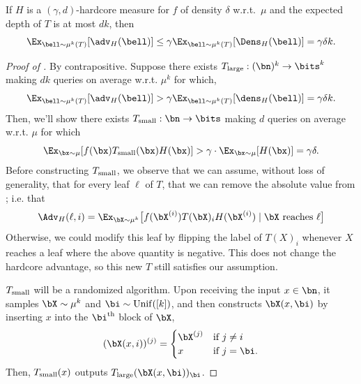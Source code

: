 \begin{lemma}
\label{lem:expected total hardcore advantage body}
    If $H$ is a $(\gamma, d)$-hardcore measure for $f$ of density $\delta$ w.r.t.~$\mu$ and the expected depth of $T$ is at most $dk$, then 
    \begin{equation*}
        \Ex_{\bell \sim \mu^k(T)}[\adv_H(\bell)] \leq \gamma \Ex_{\bell\sim\mu^k(T)}[\Dens_H(\bell)] = \gamma \delta k. 
    \end{equation*}
\end{lemma}
\begin{proof}[Proof of ]
    By contrapositive. Suppose there exists $T_{\textnormal{large}}:(\bn)^k \to \bits^k$ making $dk$ queries on average w.r.t. $\mu^k$ for which,
    \begin{equation*}
        \Ex_{\bell \sim \mu^k(T)}[\adv_H(\bell)] > \gamma \Ex_{\bell\sim \mu^k(T)}[\dens_H(\bell)] = \gamma\delta k.
    \end{equation*}
    Then, we'll show there exists $T_{\textnormal{small}}:\bn \to \bits$ making $d$ queries on average w.r.t. $\mu$ for which
    \begin{equation*}
        \Ex_{\bx \sim \mu}[ f(\bx) T_{\textnormal{small}}(\bx) H(\bx)] > \gamma \cdot \Ex_{\bx \sim \mu}[H(\bx)] = \gamma \delta.
    \end{equation*}
    Before constructing $T_{\textnormal{small}}$, we observe that we can assume, without loss of generality, that for every leaf $\ell$ of $T$, that we can remove the absolute value from ; i.e. that
    \begin{equation*}
        \Adv_H(\ell,i) = \Ex_{\bX\sim \mu^k}\big[ f(\bX^{(i)})T(\bX)_i H(\bX^{(i)})\mid \text{$\bX$ reaches $\ell$}\big]
    \end{equation*}
    Otherwise, we could modify this leaf by flipping the label of $T(X)_i$ whenever $X$ reaches a leaf where the above quantity is negative. This does not change the hardcore advantage, so this new $T$ still satisfies our assumption.
    
    $T_{\textnormal{small}}$ will be a randomized algorithm. Upon receiving the input $x \in \bn$, it samples $\bX \sim \mu^k$ and $\bi \sim \mathrm{Unif}([k])$, and then constructs $\bX(x, \bi)$ by inserting $x$ into the $\bi^{\text{th}}$ block of $\bX$,
    \begin{equation*}
        (\bX(x, i))^{(j)} = \begin{cases}
            \bX^{(j)} &\text{if }j \neq i\\
            x&\text{if }j = \bi.
        \end{cases}
    \end{equation*}
    Then, $T_{\textnormal{small}}(x)$ outputs $T_{\textnormal{large}}(\bX(x, \bi))_{\bi}$.


\end{proof}
